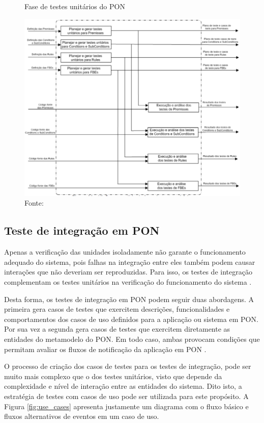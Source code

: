 \begin{figure}[!htb]
  \centering
  \caption{Fase de testes unitários do PON}
  \includegraphics[width=\textwidth]{../figures/unit_pon.png}
  \smallskip
  \caption*{Fonte: }
  \label{fig:unit_pon}
\end{figure}

\subsection{Teste de integração em PON}\label{sec:int_pon}

Apenas a verificação das unidades isoladamente não garante o funcionamento
adequado do sistema, pois falhas na integração entre eles também podem causar
interações que não deveriam ser reproduzidas. Para isso, os testes de integração
complementam os testes unitários na verificação do funcionamento do sistema
\cite{binder_1999}.

Desta forma, os testes de integração em PON podem seguir duas abordagens. A
primeira gera casos de testes que exercitem descrições, funcionalidades e
comportamentos dos casos de uso definidos para a aplicação ou sistema em PON.
Por sua vez a segunda gera casos de testes que exercitem diretamente as
entidades do metamodelo do PON. Em todo caso, ambas provocam condições que
permitam avaliar os fluxos de notificação da aplicação em PON
\cite{msc_Kossoski_2015}.

O processo de criação dos casos de testes para os testes de integração, pode ser
muito mais complexo que o dos testes unitários, visto que depende da
complexidade e nível de interação entre as entidades do sistema. Dito isto, a
estratégia de testes com casos de uso pode ser utilizada para este propósito. A
Figura \ref{fig:use_cases} apresenta justamente um diagrama com o fluxo básico e
fluxos alternativos de eventos em um caso de uso. 

